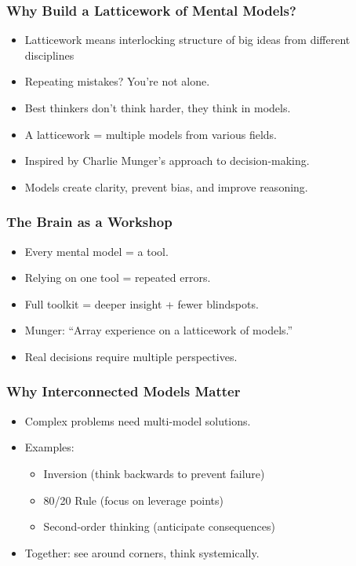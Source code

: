 \begin{frame}[fragile]\frametitle{Why Build a Latticework of Mental Models?}
  \begin{itemize}
	\item Latticework means interlocking structure of big ideas from different disciplines 
    \item Repeating mistakes? You're not alone.
    \item Best thinkers don't think harder, they think in models.
    \item A latticework = multiple models from various fields.
    \item Inspired by Charlie Munger's approach to decision-making.
    \item Models create clarity, prevent bias, and improve reasoning.
  \end{itemize}
\end{frame}

\begin{frame}[fragile]\frametitle{The Brain as a Workshop}
  \begin{itemize}
    \item Every mental model = a tool.
    \item Relying on one tool = repeated errors.
    \item Full toolkit = deeper insight + fewer blindspots.
    \item Munger: ``Array experience on a latticework of models.''
    \item Real decisions require multiple perspectives.
  \end{itemize}
\end{frame}

\begin{frame}[fragile]\frametitle{Why Interconnected Models Matter}
  \begin{itemize}
    \item Complex problems need multi-model solutions.
    \item Examples:
      \begin{itemize}
        \item Inversion (think backwards to prevent failure)
        \item 80/20 Rule (focus on leverage points)
        \item Second-order thinking (anticipate consequences)
      \end{itemize}
    \item Together: see around corners, think systemically.
  \end{itemize}
\end{frame}

